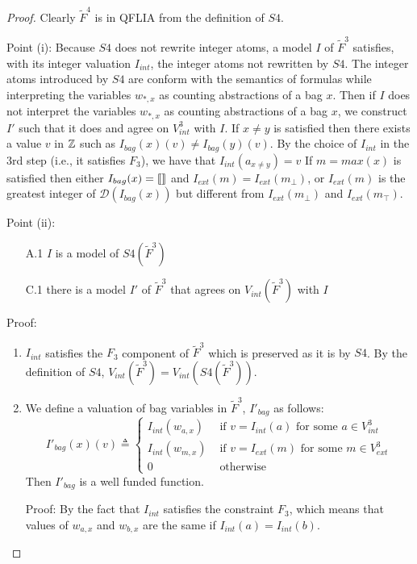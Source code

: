 \begin{proof}
Clearly $\tilde{F}^4$ is in QFLIA from the definition of $S4$.

Point (i): Because $S4$ does not rewrite integer atoms, a model $I$ of $\tilde{F}^3$ satisfies, with its integer valuation $I_{int}$, the integer atoms not rewritten by $S4$.
The integer atoms introduced by $S4$ are conform with the semantics of formulas while interpreting the variables $w_{*,x}$ as counting abstractions of a bag $x$.
Then if $I$ does not interpret the variables $w_{*,x}$ as counting abstractions of a bag $x$, we construct $I'$ such that it does and agree on $V^3_{int}$ with $I$.
If $x \neq y$ is satisfied then there exists a value $v$ in $\mathbb{Z}$ such as $I_{bag}(x)(v) \neq I_{bag}(y)(v)$. By the choice of $I_{int}$ in the 3rd step (i.e., it satisfies $F_3$), we have that $I_{int}(a_{x\neq y}) = v$
If $m = max(x)$ is satisfied then either $I_{bag}(x) = \llbracket  \rrbracket $ and $I_{ext}(m) = I_{ext}(m_{\bot})$, or $I_{ext}(m)$ is the greatest integer of $\mathcal{D}(I_{bag}(x))$ but different from $I_{ext}(m_{\bot})$ and $I_{ext}(m_{\top})$.

Point (ii):
\begin{enumerate}
\item[A.1] $I$ is a model of $S4(\tilde{F}^3)$
\item[C.1] there is a model $I'$ of $\tilde{F}^3$ that agrees on $V_{int}(\tilde{F}^3)$ with $I$
\end{enumerate}

Proof:
\begin{enumerate}[1.]
\item %
$I_{int}$ satisfies the $F_3$ component of $\tilde{F}^3$ which is preserved as it is by $S4$.
By the definition of $S4$, $V_{int}(\tilde{F}^3) = V_{int}(S4(\tilde{F}^3))$.

\item %
We define a valuation of bag variables in $\tilde{F}^3$, $I'_{bag}$ as follows:
$$
I'_{bag}(x)(v) \triangleq \left\{\begin{array}{ll}
I_{int}(w_{a,x}) & \mbox{ if } v = I_{int}(a) \mbox{ for some }a\in V^3_{int} \\
I_{int}(w_{m,x}) & \mbox{ if } v = I_{ext}(m) \mbox{ for some }m\in V^3_{ext} \\
0 & \mbox{ otherwise}
\end{array}\right.
$$
Then $I'_{bag}$ is a well funded function.

Proof: By the fact that $I_{int}$ satisfies the constraint $F_3$, which means that values of $w_{a,x}$ and $w_{b,x}$ are the same if $I_{int}(a)=I_{int}(b)$.


\end{enumerate}
\end{proof}

